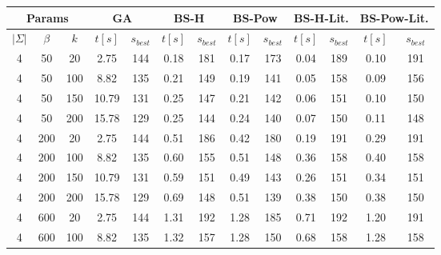 \documentclass{article}
\begin{document}
    \begin{center}
        \begin{tabular}{| c c c | c c | c c | c c | c c | c c |}
            \hline
            \multicolumn{3}{|c}{Params} & \multicolumn{2}{|c|}{GA} & \multicolumn{2}{|c|}{BS-H} & \multicolumn{2}{|c|}{BS-Pow} & \multicolumn{2}{c|}{BS-H-Lit.} & \multicolumn{2}{c|}{BS-Pow-Lit.}\\
            \hline
            $|\Sigma|$ & $\beta$ & $k$ & $t[s]$ & $s_{best}$ & $t[s]$ & $s_{best}$ & $t[s]$ & $s_{best}$ & $t[s]$ & $s_{best}$ & $t[s]$ & $s_{best}$\\
            \hline
            4          & 50      & 20  & 2.75   & 144        & 0.18   & 181        & 0.17   & 173        & 0.04   & 189        & 0.10   & 191        \\
            \hline
            4          & 50      & 100 & 8.82   & 135        & 0.21   & 149        & 0.19   & 141        & 0.05   & 158        & 0.09   & 156        \\
            \hline
            4          & 50      & 150 & 10.79  & 131        & 0.25   & 147        & 0.21   & 142        & 0.06   & 151        & 0.10   & 150        \\
            \hline
            4          & 50      & 200 & 15.78  & 129        & 0.25   & 144        & 0.24   & 140        & 0.07   & 150        & 0.11   & 148        \\
            \hline
            4          & 200     & 20  & 2.75   & 144        & 0.51   & 186        & 0.42   & 180        & 0.19   & 191        & 0.29   & 191        \\
            \hline
            4          & 200     & 100 & 8.82   & 135        & 0.60   & 155        & 0.51   & 148        & 0.36   & 158        & 0.40   & 158        \\
            \hline
            4          & 200     & 150 & 10.79  & 131        & 0.59   & 151        & 0.49   & 143        & 0.26   & 151        & 0.34   & 151        \\
            \hline
            4          & 200     & 200 & 15.78  & 129        & 0.69   & 148        & 0.51   & 139        & 0.38   & 150        & 0.38   & 150        \\
            \hline
            4          & 600     & 20  & 2.75   & 144        & 1.31   & 192        & 1.28   & 185        & 0.71   & 192        & 1.20   & 191        \\
            \hline
            4          & 600     & 100 & 8.82   & 135        & 1.32   & 157        & 1.28   & 150        & 0.68   & 158        & 1.28   & 158        \\

\end{tabular}
\end{center}
\end{document}
